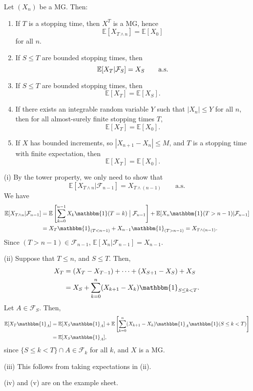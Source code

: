 \documentclass[12pt]{article}
\begin{document}
\begin{theorem}
	Let $(X_n)$ be a MG. Then:
	\begin{enumerate}[\normalfont(i)]
		\item If $T$ is a stopping time, then $X^T$ is a MG, hence
			\[
			\mathbb{E}[X_{T \wedge n}] = \mathbb{E}[X_0]
			\]
			for all $n$.
		\item If $S \leq T$ are bounded stopping times, then
			\[
				\mathbb{E}[X_T|\mathcal{F}_S] = X_S \qquad \text{\normalfont{a.s.}}
			\]
		\item If $S \leq T$ are bounded stopping times, then
			\[
			\mathbb{E}[X_T] = \mathbb{E}[X_S].
			\]
		\item If there exists an integrable random variable $Y$ such that $|X_n| \leq Y$ for all $n$, then for all almost-surely finite stopping times $T$,
			\[
			\mathbb{E}[X_T] = \mathbb{E}[X_0].
			\]
		\item If $X$ has bounded increments, so $|X_{n+1} - X_n| \leq M$, and $T$ is a stopping time with finite expectation, then
			\[
			\mathbb{E}[X_T] = \mathbb{E}[X_0].
			\]
	\end{enumerate}
\end{theorem}

\begin{proofbox}
	

	(i) By the tower property, we only need to show that
	\[
		\mathbb{E}[X_{T \wedge n} | \mathcal{F}_{n-1}] = X_{T \wedge (n-1)} \qquad \text{a.s.}
	\]
	We have
	\begin{align*}
		\mathbb{E}[X_{T \wedge n}|\mathcal{F}_{n-1}] &= \mathbb{E}\left[ \sum_{k = 0}^{n-1} X_k \mathbbm{1}(T = k) \bigm| \mathcal{F}_{n-1} \right] + \mathbb{E}[X_n \mathbbm{1}(T > n-1) | \mathcal{F}_{n-1}] \\
							     &= X_T \mathbbm{1}_{(T < n-1)} + X_{n-1} \mathbbm{1}_{(T > n - 1)} = X_{T \wedge (n - 1)}.
	\end{align*}
	Since $(T > n-1) \in \mathcal{F}_{n-1}$, $\mathbb{E}[X_n|\mathcal{F}_{n-1}] = X_{n-1}$.

	(ii) Suppose that $T \leq n$, and $S \leq T$. Then,
	\begin{align*}
		X_T &= (X_T - X_{T-1}) + \cdots + (X_{S+1} - X_S) + X_S \\
		    &= X_S + \sum_{k = 0}^n (X_{k+1} - X_k) \mathbbm{1}_{S \leq k < T}.
	\end{align*}
	Let $A \in \mathcal{F}_S$. Then,
	\begin{align*}
		\mathbb{E}[X_T \mathbbm{1}_{A}] &= \mathbb{E}[X_S \mathbbm{1}_{A}] + \mathbb{E}\left[ \sum_{k = 0}^n (X_{k+1} - X_k) \mathbbm{1}_{A} \mathbbm{1}(S \leq k < T) \right] \\
						&= \mathbb{E}[X_S \mathbbm{1}_{A}],
	\end{align*}
	since $\{S \leq k < T\} \cap A \in \mathcal{F}_k$ for all $k$, and $X$ is a MG.


	(iii) This follows from taking expectations in (ii).

	(iv) and (v) are on the example sheet.
\end{proofbox}
\end{document}
